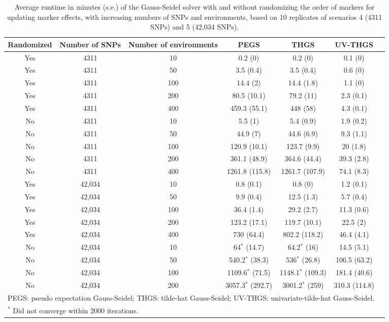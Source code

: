 \documentclass{bmcart}
\begin{document}
\begin{table}[ht]
\centering
\renewcommand*{\arraystretch}{1.2}
\caption{Average runtime in minutes (s.e.) of the Gauss-Seidel solver with and without randomizing the order of markers for updating marker effects, with increasing numbers of SNPs and environments, based on 10 replicates of scenarios 4 (4311 SNPs) and 5 (42,034 SNPs).}\smallskip
\begin{tabular}{c c c c c c c}
 \hline
 Randomized & Number of SNPs & Number of environments & PEGS & THGS & UV-THGS \\ 
 \hline
Yes &  4311 &  10 & 0.2 (0) & 0.2 (0) & 0.1 (0) & \\
Yes &  4311 &  50 & 3.5 (0.4) & 3.5 (0.4) & 0.6 (0) & \\
Yes &  4311 & 100 & 14.4 (2) & 14.4 (1.8) & 1.1 (0) & \\
Yes &  4311 & 200 & 80.5 (10.1) & 79.2 (11) & 2.3 (0.1) & \\
Yes &  4311 & 400 & 459.3 (55.1) & 448 (58) & 4.3 (0.1) & \\
No &  4311 &  10 & 5.5 (1) & 5.4 (0.9) & 1.9 (0.2) & \\
No &  4311 &  50 & 44.9 (7) & 44.6 (6.9) & 9.3 (1.1) & \\
No &  4311 & 100 & 120.9 (10.1) & 123.7 (9.9) & 20 (1.8) & \\
No &  4311 & 200 & 361.1 (48.9) & 364.6 (44.4) & 39.3 (2.8) & \\
No &  4311 & 400 & 1261.8 (115.8) & 1261.7 (107.9) & 74.1 (8.3) & \\
Yes & 42,034 &  10 & 0.8 (0.1) & 0.8 (0) & 1.2 (0.1) & \\
Yes & 42,034 &  50 & 9.9 (0.4) & 12.5 (1.3) & 5.7 (0.4) & \\
Yes & 42,034 & 100 & 36.4 (1.4) & 29.2 (2.7) & 11.3 (0.6) & \\
Yes & 42,034 & 200 & 123.2 (17.1) & 119.7 (10.1) & 22.5 (2) & \\
Yes & 42,034 & 400 & 730 (64.4) & 802.2 (118.2) & 46.4 (4.1) & \\
No & 42,034 &  10 & 64$^*$ (14.7) & 64.2$^*$ (16) & 14.5 (5.1) & \\
No & 42,034 &  50 & 540.2$^*$ (38.3) & 536$^*$ (26.8) & 106.5 (63.2) & \\
No & 42,034 & 100 & 1109.6$^*$ (71.5) & 1148.1$^*$ (109.3) & 181.4 (40.6) & \\
No & 42,034 & 200 & 3057.3$^*$ (292.7) & 3001.2$^*$ (259) & 310.3 (114.8) & \\
\hline
\multicolumn{6}{l}{\small PEGS: pseudo expectation Gauss-Seidel; THGS: tilde-hat Gauss-Seidel; UV-THGS: univariate-tilde-hat Gauss-Seidel.}\\
\multicolumn{6}{l}{\small{$^*$ Did not converge within 2000 iterations.}} \\
\end{tabular}
\label{RUNTIME2}
\end{table}
\end{document}
